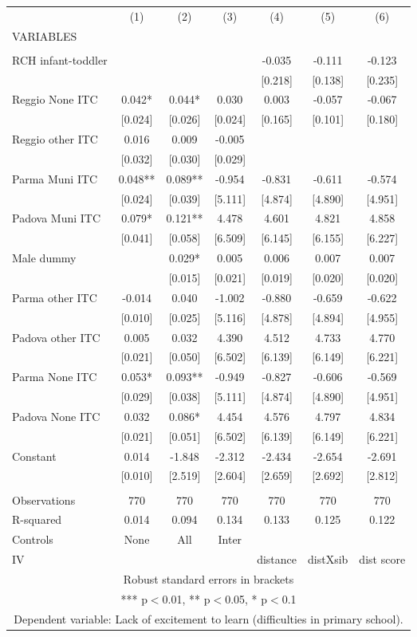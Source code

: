 \begin{tabular}{lcccccc} \hline
 & (1) & (2) & (3) & (4) & (5) & (6) \\
VARIABLES &  &  &  &  &  &  \\ \hline
 &  &  &  &  &  &  \\
RCH infant-toddler &  &  &  & -0.035 & -0.111 & -0.123 \\
 &  &  &  & [0.218] & [0.138] & [0.235] \\
Reggio None ITC & 0.042* & 0.044* & 0.030 & 0.003 & -0.057 & -0.067 \\
 & [0.024] & [0.026] & [0.024] & [0.165] & [0.101] & [0.180] \\
Reggio other ITC & 0.016 & 0.009 & -0.005 &  &  &  \\
 & [0.032] & [0.030] & [0.029] &  &  &  \\
Parma Muni ITC & 0.048** & 0.089** & -0.954 & -0.831 & -0.611 & -0.574 \\
 & [0.024] & [0.039] & [5.111] & [4.874] & [4.890] & [4.951] \\
Padova Muni ITC & 0.079* & 0.121** & 4.478 & 4.601 & 4.821 & 4.858 \\
 & [0.041] & [0.058] & [6.509] & [6.145] & [6.155] & [6.227] \\
Male dummy &  & 0.029* & 0.005 & 0.006 & 0.007 & 0.007 \\
 &  & [0.015] & [0.021] & [0.019] & [0.020] & [0.020] \\
Parma other ITC & -0.014 & 0.040 & -1.002 & -0.880 & -0.659 & -0.622 \\
 & [0.010] & [0.025] & [5.116] & [4.878] & [4.894] & [4.955] \\
Padova other ITC & 0.005 & 0.032 & 4.390 & 4.512 & 4.733 & 4.770 \\
 & [0.021] & [0.050] & [6.502] & [6.139] & [6.149] & [6.221] \\
Parma None ITC & 0.053* & 0.093** & -0.949 & -0.827 & -0.606 & -0.569 \\
 & [0.029] & [0.038] & [5.111] & [4.874] & [4.890] & [4.951] \\
Padova None ITC & 0.032 & 0.086* & 4.454 & 4.576 & 4.797 & 4.834 \\
 & [0.021] & [0.051] & [6.502] & [6.139] & [6.149] & [6.221] \\
Constant & 0.014 & -1.848 & -2.312 & -2.434 & -2.654 & -2.691 \\
 & [0.010] & [2.519] & [2.604] & [2.659] & [2.692] & [2.812] \\
 &  &  &  &  &  &  \\
Observations & 770 & 770 & 770 & 770 & 770 & 770 \\
R-squared & 0.014 & 0.094 & 0.134 & 0.133 & 0.125 & 0.122 \\
Controls & None & All & Inter &  &  &  \\
 IV &  &  &  & distance & distXsib & dist score \\ \hline
\multicolumn{7}{c}{ Robust standard errors in brackets} \\
\multicolumn{7}{c}{ *** p$<$0.01, ** p$<$0.05, * p$<$0.1} \\
\multicolumn{7}{c}{ Dependent variable: Lack of excitement to learn (difficulties in primary school).} \\
\end{tabular}
